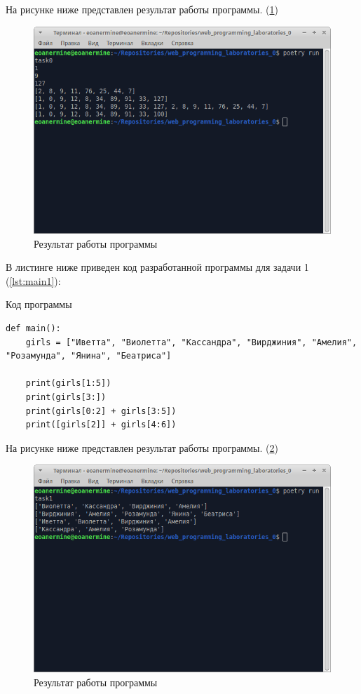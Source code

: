 \documentclass[14pt]{extarticle}
\newenvironment{code}{\captionsetup{type=listing, belowskip=-14pt plus 3pt minus 0pt}}{}
\begin{document}
На рисунке ниже представлен результат работы программы. (\ref{img:main0})

\begin{figure}[H]
    \centering
    \includegraphics[width=1.0\linewidth]{main0.png}
    \caption{Результат работы программы\label{img:main0}}
\end{figure}

В листинге ниже приведен код разработанной программы для задачи 1 (\ref{lst:main1}):

\begin{code}    
\caption{Код программы\label{lst:main1}}
\begin{verbatim}
def main():
	girls = ["Иветта", "Виолетта", "Кассандра", "Вирджиния", "Амелия", "Розамунда", "Янина", "Беатриса"]

	print(girls[1:5])
	print(girls[3:])
	print(girls[0:2] + girls[3:5])
	print([girls[2]] + girls[4:6])
\end{verbatim}
\end{code}

На рисунке ниже представлен результат работы программы. (\ref{img:main1})

\begin{figure}[H]
    \centering
    \includegraphics[width=1.0\linewidth]{main1.png}
    \caption{Результат работы программы\label{img:main1}}
\end{figure}
\end{document}
